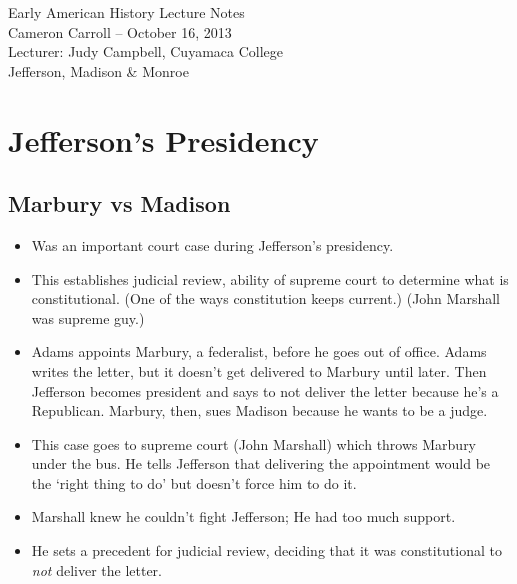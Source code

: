 \documentclass{article}
\begin{document}
  \begin{center}
    {\small{} Early American History Lecture Notes} \\[0.6cm]
    {\small{} Cameron Carroll -- October 16, 2013} \\[0.6cm]
    {\small{} Lecturer: Judy Campbell, Cuyamaca College}\\[1cm]
    {\small{} Jefferson, Madison \& Monroe}\\[1cm]
  \end{center}
  
  \tableofcontents
  \newpage

  \section{Jefferson's Presidency}

    \subsection{Marbury vs Madison}
      \begin{itemize}
        \item Was an important court case during Jefferson's presidency. 
        \item This establishes judicial review, ability of supreme court to determine what is constitutional. (One of the ways constitution keeps current.) (John Marshall was supreme guy.)
        \item Adams appoints Marbury, a federalist, before he goes out of office. Adams writes the letter, but it doesn't get delivered to Marbury until later. Then Jefferson becomes president and says to not deliver the letter because he's a Republican. Marbury, then, sues Madison because he wants to be a judge. 
        \item This case goes to supreme court (John Marshall) which throws Marbury under the bus. He tells Jefferson that delivering the appointment would be the `right thing to do' but doesn't force him to do it.
        \item Marshall knew he couldn't fight Jefferson; He had too much support.
        \item He sets a precedent for judicial review, deciding that it was constitutional to \emph{not} deliver the letter.
      \end{itemize}
\end{document}

